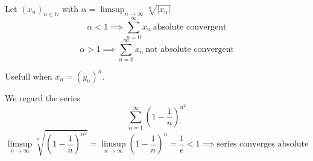 
\begin{proposition}\label{pro:root_test}
   Let \((x_n)_{n \in \mathbb{N}}\) with \(\alpha = \limsup_{n \to \infty} \sqrt[n]{|x_n|}\)
   \[\alpha < 1 \implies \sum_{n=0}^\infty x_n~\text{absolute convergent}\]
   \[\alpha > 1 \implies \sum_{n=0}^\infty x_n~\text{not absolute convergent}\]
\end{proposition}
\begin{remark}
   Usefull when \(x_n = (y_n)^n\).
\end{remark}
\begin{example}
   We regard the series
   \[\sum_{n=1}^\infty \left(1 - \frac{1}{n}\right)^{n^2}\]
   \[\limsup_{n \to \infty} \sqrt[n]{\left(1 - \frac{1}{n}\right)^{n^2}} = \limsup_{n \to \infty} \left(1 - \frac{1}{n}\right)^n = \frac{1}{e} < 1 \implies \text{series converges absolute}\]
\end{example}

